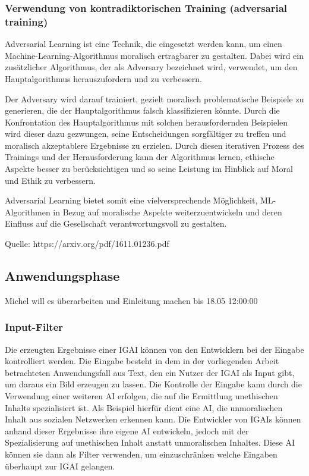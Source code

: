 \documentclass[12pt]{article}
\begin{document}
\subsubsection{Verwendung von kontradiktorischen Training (adversarial training)}
Adversarial Learning ist eine Technik, die eingesetzt werden kann, um einen Machine-Learning-Algorithmus moralisch ertragbarer zu gestalten. 
Dabei wird ein zusätzlicher Algorithmus, der als Adversary bezeichnet wird, verwendet, um den Hauptalgorithmus herauszufordern und zu verbessern. 

Der Adversary wird darauf trainiert, gezielt moralisch problematische Beispiele zu generieren, die der Hauptalgorithmus falsch klassifizieren könnte. 
Durch die Konfrontation des Hauptalgorithmus mit solchen herausfordernden Beispielen wird dieser dazu gezwungen, seine Entscheidungen sorgfältiger zu treffen und moralisch akzeptablere Ergebnisse zu erzielen. Durch diesen iterativen Prozess des Trainings und der Herausforderung kann der Algorithmus lernen, ethische Aspekte besser zu berücksichtigen und so seine Leistung im Hinblick auf Moral und Ethik zu verbessern. 

Adversarial Learning bietet somit eine vielversprechende Möglichkeit, ML-Algorithmen in Bezug auf moralische Aspekte weiterzuentwickeln und deren Einfluss auf die Gesellschaft verantwortungsvoll zu gestalten.

Quelle: https://arxiv.org/pdf/1611.01236.pdf

\subsection{Anwendungsphase}

Michel will es überarbeiten und Einleitung machen bis 18.05 12:00:00
\subsubsection{Input-Filter}
Die erzeugten Ergebnisse einer IGAI können von den Entwicklern bei der Eingabe kontrolliert werden. Die Eingabe besteht in dem in der vorliegenden Arbeit betrachteten Anwendungsfall aus Text, den ein Nutzer der IGAI als Input gibt, um daraus ein Bild erzeugen zu lassen. Die Kontrolle der Eingabe kann durch die Verwendung einer weiteren AI erfolgen, die auf die Ermittlung unethischen Inhalts spezialisiert ist. Als Beispiel hierfür dient eine AI, die unmoralischen Inhalt aus sozialen Netzwerken erkennen kann. Die Entwickler von IGAIs können anhand dieser Ergebnisse ihre eigene AI entwickeln, jedoch mit der Spezialisierung auf unethischen Inhalt anstatt unmoralischen Inhaltes. Diese AI können sie dann als Filter verwenden, um einzuschränken welche Eingaben überhaupt zur IGAI gelangen.
\end{document}
